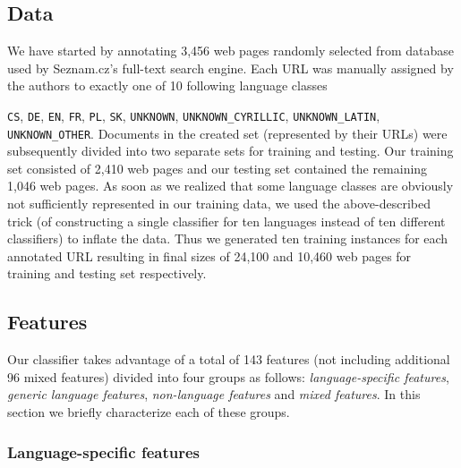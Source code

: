 \documentclass{acm_proc_article-sp}
\begin{document}
  \subsection{Data}

  We have started by annotating 3,456 web pages randomly selected from database
  used by Seznam.cz's full-text search engine. Each URL was manually assigned
  by the authors to exactly one of 10 following language classes {\texttt{CS}, \texttt{DE},
  \texttt{EN}, \texttt{FR}, \texttt{PL}, \texttt{SK}, \texttt{UNKNOWN}, 
  \texttt{UNKNOWN\_CYRILLIC}, \texttt{UNKNOWN\_LATIN},
  \texttt{UNKNOWN\_OTHER}. Documents in the created set (represented by their
  URLs) were subsequently divided into two separate sets for training and
  testing. Our training set consisted of 2,410 web pages and our testing set
  contained the remaining 1,046 web pages. As soon as we realized that some
  language classes are obviously not sufficiently represented in our training
  data, we used the above-described trick (of constructing a single classifier for
  ten languages instead of ten different classifiers) to inflate the data. Thus
  we generated ten training instances for each annotated URL resulting in final
  sizes of 24,100 and 10,460 web pages for training and testing set respectively.


  \subsection{Features}
  Our classifier takes advantage of a total of 143 features (not including additional 96 mixed features) divided into four groups
  as follows: \textit{language-specific features}, \textit{generic language features}, \textit{non-language
  features} and \textit{mixed features}. In this section we briefly characterize each of these
  groups.

\subsubsection{Language-specific features}

}
\end{document}
